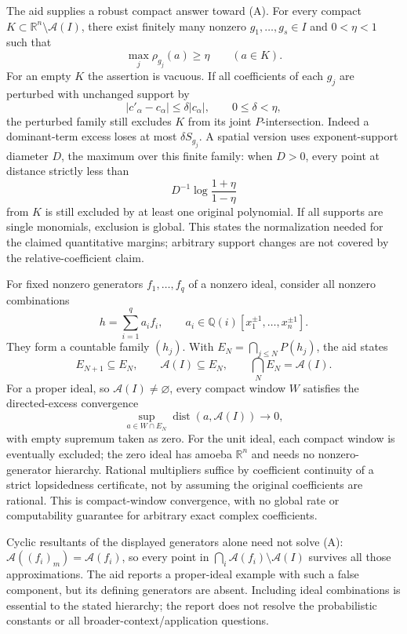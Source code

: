 \documentclass[11pt]{article}
\newcommand{\Q}{\mathbb{Q}}
\newcommand{\R}{\mathbb{R}}
\begin{document}
The aid supplies a robust compact answer toward (A). For every compact \(K\subset\R^n\setminus\mathcal A(I)\), there exist finitely many nonzero \(g_1,\ldots,g_s\in I\) and \(0<\eta<1\) such that
\[
 \max_j\rho_{g_j}(a)\geq\eta\qquad(a\in K).
\]
For an empty \(K\) the assertion is vacuous. If all coefficients of each \(g_j\) are perturbed with unchanged support by
\[
 |c'_\alpha-c_\alpha|\leq\delta|c_\alpha|,
 \qquad0\leq\delta<\eta,
\]
the perturbed family still excludes \(K\) from its joint \(P\)-intersection. Indeed a dominant-term excess loses at most \(\delta S_{g_j}\). A spatial version uses exponent-support diameter \(D\), the maximum over this finite family: when \(D>0\), every point at distance strictly less than
\[
 D^{-1}\log\frac{1+\eta}{1-\eta}
\]
from \(K\) is still excluded by at least one original polynomial. If all supports are single monomials, exclusion is global. This states the normalization needed for the claimed quantitative margins; arbitrary support changes are not covered by the relative-coefficient claim.

For fixed nonzero generators \(f_1,\ldots,f_q\) of a nonzero ideal, consider all nonzero combinations
\[
 h=\sum_{i=1}^q a_i f_i,
 \qquad a_i\in\Q(i)[x_1^{\pm1},\ldots,x_n^{\pm1}].
\]
They form a countable family \((h_j)\). With \(E_N=\bigcap_{j\leq N}P(h_j)\), the aid states
\[
 E_{N+1}\subseteq E_N,\qquad
 \mathcal A(I)\subseteq E_N,\qquad
 \bigcap_NE_N=\mathcal A(I).
\]
For a proper ideal, so \(\mathcal A(I)\ne\varnothing\), every compact window \(W\) satisfies the directed-excess convergence
\[
 \sup_{a\in W\cap E_N}\operatorname{dist}(a,\mathcal A(I))\to0,
\]
with empty supremum taken as zero. For the unit ideal, each compact window is eventually excluded; the zero ideal has amoeba \(\R^n\) and needs no nonzero-generator hierarchy. Rational multipliers suffice by coefficient continuity of a strict lopsidedness certificate, not by assuming the original coefficients are rational. This is compact-window convergence, with no global rate or computability guarantee for arbitrary exact complex coefficients.

Cyclic resultants of the displayed generators alone need not solve (A): \(\mathcal A((f_i)_m)=\mathcal A(f_i)\), so every point in \(\bigcap_i\mathcal A(f_i)\setminus\mathcal A(I)\) survives all those approximations. The aid reports a proper-ideal example with such a false component, but its defining generators are absent. Including ideal combinations is essential to the stated hierarchy; the report does not resolve the probabilistic constants or all broader-context/application questions.
\end{document}
